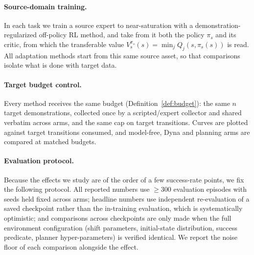 \paragraph{Source-domain training.}
In each task we train a source expert to near-saturation with a
demonstration-regularized off-policy RL method, and take from it both the
policy $\pi_s$ and its critic, from which the transferable value
$V^{\pi_s}_{s}(s) = \min_j Q_j(s, \pi_s(s))$ is read. All
adaptation methods start from this same source asset, so that comparisons
isolate what is done with target data.

\paragraph{Target budget control.}
Every method receives the same budget (Definition~\ref{def:budget}): the same
$n$ target demonstrations, collected once by a scripted/expert collector and
shared verbatim across arms, and the same cap on target transitions. Curves
are plotted against target transitions consumed, and model-free, Dyna and
planning arms are compared at matched budgets.

\paragraph{Evaluation protocol.}
Because the effects we study are of the order of a few success-rate points, we
fix the following protocol. All reported numbers use $\ge 300$ evaluation
episodes with seeds held fixed across arms; headline numbers use independent
re-evaluation of a saved checkpoint rather than the in-training evaluation,
which is systematically optimistic; and comparisons across checkpoints are only
made when the full environment configuration (shift parameters, initial-state
distribution, success predicate, planner hyper-parameters) is verified
identical. We report the noise floor of each comparison alongside the effect.


